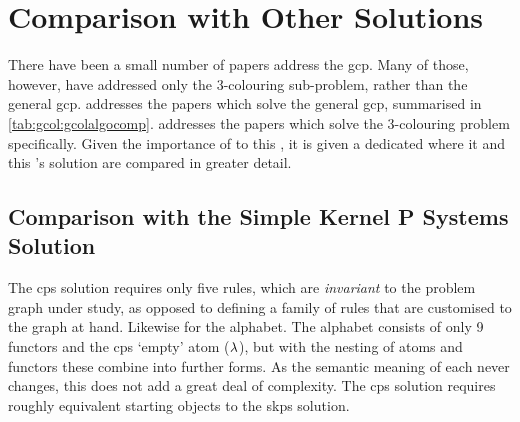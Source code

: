 \section{Comparison with Other  Solutions}

There have been a small number of papers address the \gls{gcp}.  Many of those, however, have addressed only the 3-colouring sub-problem, rather than the general \gls{gcp}.   addresses the papers which solve the general \gls{gcp}, summarised in \cref{tab:gcol:gcolalgocomp}.   addresses the papers which solve the 3-colouring problem specifically.  Given the importance of \cite{Gheorghe2013} to this , it is given a dedicated  where it and this 's solution are compared in greater detail.

\subsection{\label{sec:gcol:skpcomp}Comparison with the Simple Kernel P Systems Solution}
The \gls{cps} solution requires only five rules, which are \emph{invariant} to the problem graph under study, as opposed to defining a family of rules that are customised to the graph at hand.  Likewise for the alphabet.  The alphabet consists of only 9 functors and the \gls{cps} `empty' atom (\(\lambda\)), but with the nesting of atoms and functors these combine into further forms.  As the semantic meaning of each never changes, this does not add a great deal of complexity.  The \gls{cps} solution requires roughly equivalent starting objects to the \gls{skps} solution.


